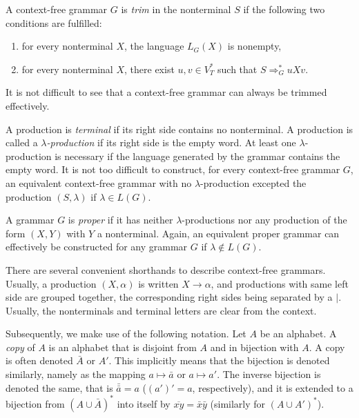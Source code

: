 A context-free grammar $G$ is \emph{trim} in the nonterminal $S$ if the following two conditions are fulfilled:

\begin{enumerate}
\item for every nonterminal $X$, the language $L_G(X)$ is nonempty,
\item for every nonterminal $X$, there exist $u, v \in V_T^*$ such that $S \Rightarrow^*_G uXv$.
\end{enumerate}

It is not difficult to see that a context-free grammar can always be trimmed effectively.

A production is \emph{terminal} if its right side contains no nonterminal. A production is called a  \emph{$\lambda$-production} if its right side is the empty word. At least one $\lambda$-production is necessary if the language generated by the grammar contains the empty word. It is not too difficult to construct, for every context-free grammar $G$, an equivalent context-free grammar with no $\lambda$-production excepted the production $(S, \lambda)$ if $\lambda \in L(G)$.

A grammar $G$ is \emph{proper} if it has neither $\lambda$-productions nor any production of the form $(X, Y)$ with $Y$ a nonterminal. Again, an equivalent proper grammar can effectively be constructed for any grammar $G$ if $\lambda \notin L(G)$.

There are several convenient shorthands to describe context-free grammars. Usually, a production $(X, \alpha)$ is written $X \to \alpha$, and productions with same left side are grouped together, the corresponding right sides being separated by a $\mid$. Usually, the nonterminals and terminal letters are clear from the context.

Subsequently, we make use of the following notation. Let $A$ be an alphabet. A \emph{copy} of $A$ is an alphabet that is disjoint from $A$ and in bijection with $A$. A copy is often denoted $\bar{A}$ or $A'$. This implicitly means that the bijection is denoted similarly, namely as the mapping $a \mapsto \bar{a}$ or $a \mapsto a'$. The inverse bijection is denoted the same, that is $\bar{\bar{a}} = a$ ($(a')' = a$, respectively), and it is extended to a bijection from $(A \cup \bar{A})^*$ into itself  by $\overline{xy} = \bar{x} \bar{y}$ (similarly for $(A \cup A')^*$).


